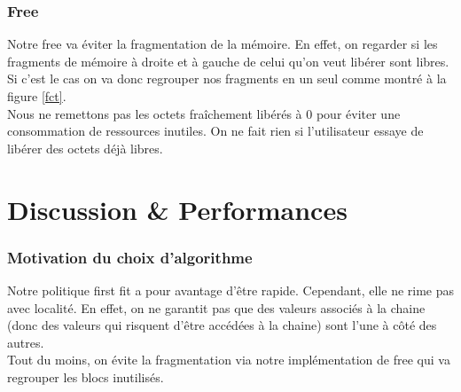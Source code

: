 \documentclass{article}
\begin{document}
\subsubsection{Free}
\label{free}
Notre free va éviter la fragmentation de la mémoire. En effet, on regarder si les fragments de mémoire à droite et à gauche de celui qu'on veut libérer sont libres. Si c'est le cas on va donc regrouper nos fragments en un seul comme montré à la figure \ref{fct}.\\
Nous ne remettons pas les octets fraîchement libérés à 0 pour éviter une consommation de ressources inutiles. On ne fait rien si l'utilisateur essaye de libérer des octets déjà libres.


\section{Discussion \& Performances}
\label{perf}

\subsubsection*{Motivation du choix d'algorithme}
Notre politique first fit a pour avantage d'être rapide. Cependant, elle ne rime pas avec localité. En effet, on ne garantit pas que des valeurs associés à la chaine (donc des valeurs qui risquent d'être accédées à la chaine) sont l'une à côté des autres.\\
Tout du moins, on évite la fragmentation via notre implémentation de free qui va regrouper les blocs inutilisés.
\end{document}
